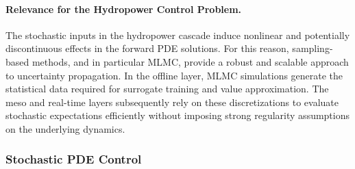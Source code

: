 \documentclass{article}
\newcommand{\1}{\mathds{1}}          %
\theoremstyle{definition}
\begin{document}
\begin{sloppypar}
\paragraph{Relevance for the Hydropower Control Problem.}
The stochastic inputs in the hydropower cascade induce nonlinear and potentially
discontinuous effects in the forward PDE solutions. For this reason,
sampling-based methods, and in particular MLMC, provide a robust and scalable
approach to uncertainty propagation. In the offline layer, MLMC simulations
generate the statistical data required for surrogate training and value
approximation. The meso and real-time layers subsequently rely on these
discretizations to evaluate stochastic expectations efficiently without imposing
strong regularity assumptions on the underlying dynamics.
\subsubsection{Stochastic PDE Control}







\end{sloppypar}
\end{document}

